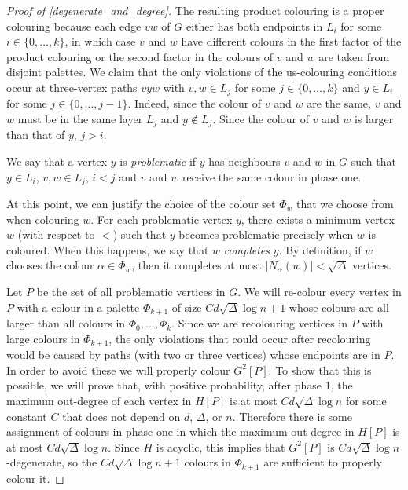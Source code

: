 \documentclass{patmorin}
\newcommand{\defin}[1]{\emph{\color{brightmaroon}#1}}
\begin{document}
\begin{proof}[Proof of \cref{degenerate_and_degree}]
  The resulting product colouring is a proper colouring because each edge $vw$ of $G$ either has both endpoints in $L_i$ for some $i\in\{0,\ldots,k\}$, in which case $v$ and $w$ have different colours in the first factor of the product colouring or the second factor in the colours of $v$ and $w$ are taken from disjoint palettes.  We claim that the only violations of the us-colouring conditions occur at three-vertex paths $vyw$ with $v,w\in L_j$ for some $j\in\{0,\ldots,k\}$ and $y\in L_i$ for some $j\in\{0,\ldots,j-1\}$. Indeed, since the colour of $v$ and $w$ are the same, $v$ and $w$ must be in the same layer $L_j$ and $y\not\in L_j$.  Since the colour of $v$ and $w$ is larger than that of $y$, $j> i$.

  We say that a vertex $y$ is \defin{problematic} if $y$ has neighbours $v$ and $w$ in $G$ such that $y\in L_i$, $v,w\in L_j$, $i < j$ and $v$ and $w$ receive the same colour in phase one.

  At this point, we can justify the choice of the colour set $\Phi_w$ that we choose from when colouring $w$. For each problematic vertex $y$, there exists a minimum vertex $w$ (with respect to $<$) such that $y$ becomes problematic precisely when $w$ is coloured.  When this happens, we say that $w$ \defin{completes} $y$. By definition, if $w$ chooses the colour $\alpha\in\Phi_w$, then it completes at most $|N_{\alpha}(w)|<\sqrt{\Delta}$ vertices.

  Let $P$ be the set of all problematic vertices in $G$.  We will re-colour every vertex in $P$ with a colour in a palette $\Phi_{k+1}$ of size $Cd\sqrt{\Delta}\log n+1$ whose colours are all larger than all colours in $\Phi_0,\ldots,\Phi_k$.  Since we are recolouring vertices in $P$ with large colours in $\Phi_{k+1}$, the only violations that could occur after recolouring would be caused by paths (with two or three vertices) whose endpoints are in $P$.  In order to avoid these we will properly colour $G^2[P]$.  To show that this is possible, we will prove that, with positive probability, after phase 1, the maximum out-degree of each vertex in $H[P]$ is at most $Cd\sqrt{\Delta}\log n$ for some constant $C$ that does not depend on $d$, $\Delta$, or $n$.  Therefore there is some assignment of colours in phase one in which the maximum out-degree in $H[P]$ is at most $Cd\sqrt{\Delta}\log n$.  Since $H$ is acyclic, this implies that $G^2[P]$ is $Cd\sqrt{\Delta}\log n$-degenerate, so the $Cd\sqrt{\Delta}\log n+1$ colours in $\Phi_{k+1}$ are sufficient to properly colour it.


\end{proof}
\end{document}
